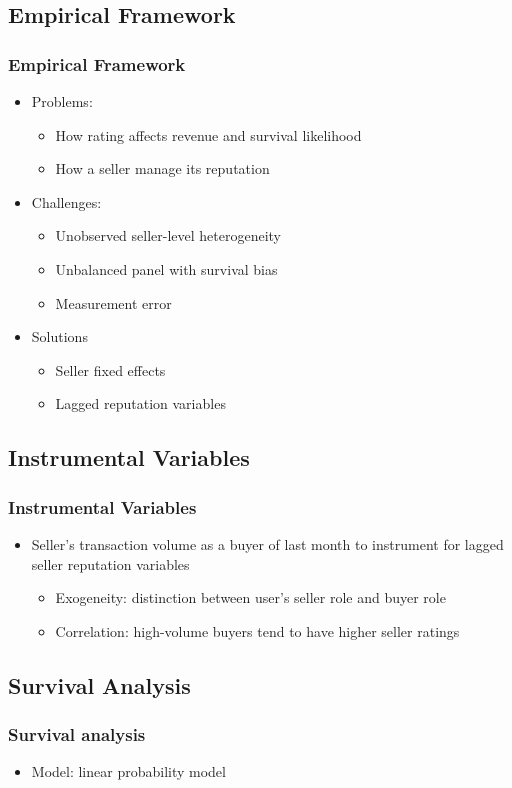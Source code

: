 \documentclass{beamer}
\begin{document}
\subsection{Empirical Framework}
\begin{frame}[allowframebreaks]
\frametitle{Empirical Framework}
\begin{itemize}
\item Problems:
\begin{itemize}
  \item How rating affects revenue and survival likelihood
  \item How a seller manage its reputation
\end{itemize}
\item Challenges:
\begin{itemize}
  \item Unobserved seller-level heterogeneity
  \item Unbalanced panel with survival bias
  \item Measurement error
\end{itemize}
\framebreak
\item Solutions
\begin{itemize}
  \item Seller fixed effects
  \item Lagged reputation variables
\end{itemize}
\end{itemize}
\end{frame}

\subsection{Instrumental Variables}
\begin{frame}
\frametitle{Instrumental Variables}
\begin{itemize}
\item Seller's transaction volume as a buyer of last month to instrument for lagged seller reputation variables
    \begin{itemize}
    \item Exogeneity: distinction between user's seller role and buyer role
    \item Correlation: high-volume buyers tend to have higher seller ratings
    \end{itemize}
\end{itemize}
\end{frame}

\subsection{Survival Analysis}
\begin{frame}
\frametitle{Survival analysis}
\begin{itemize}
\item Model: linear probability model
\end{itemize}
\end{frame}
\end{document}

